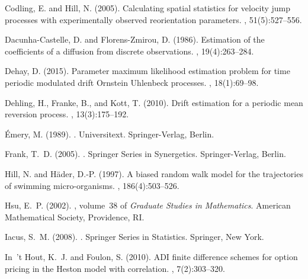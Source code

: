 \documentclass[oneside,11pt]{article}
\begin{document}
\begin{thebibliography}{}
	Codling, E. and Hill, N. (2005).
	\newblock Calculating spatial statistics for velocity jump processes with
	experimentally observed reorientation parameters.
	, 51(5):527--556.
	
	Dacunha-Castelle, D. and Florens-Zmirou, D. (1986).
	\newblock Estimation of the coefficients of a diffusion from discrete
	observations.
	, 19(4):263--284.
	
	Dehay, D. (2015).
	\newblock Parameter maximum likelihood estimation problem for time periodic
	modulated drift {O}rnstein {U}hlenbeck processes.
	, 18(1):69--98.
	
	Dehling, H., Franke, B., and Kott, T. (2010).
	\newblock Drift estimation for a periodic mean reversion process.
	, 13(3):175--192.
	
	{\'E}mery, M. (1989).
	.
	\newblock Universitext. Springer-Verlag, Berlin.
	
	Frank, T.~D. (2005).
	.
	\newblock Springer Series in Synergetics. Springer-Verlag, Berlin.
	
	Hill, N. and H{\"a}der, D.-P. (1997).
	\newblock A biased random walk model for the trajectories of swimming
	micro-organisms.
	, 186(4):503--526.
	
	Hsu, E.~P. (2002).
	, volume~38 of {\em Graduate
		Studies in Mathematics}.
	\newblock American Mathematical Society, Providence, RI.
	
	Iacus, S.~M. (2008).
	.
	\newblock Springer Series in Statistics. Springer, New York.
	
	In~'t Hout, K.~J. and Foulon, S. (2010).
	\newblock A{DI} finite difference schemes for option pricing in the {H}eston
	model with correlation.
	, 7(2):303--320.
	

\end{thebibliography}
\end{document}

